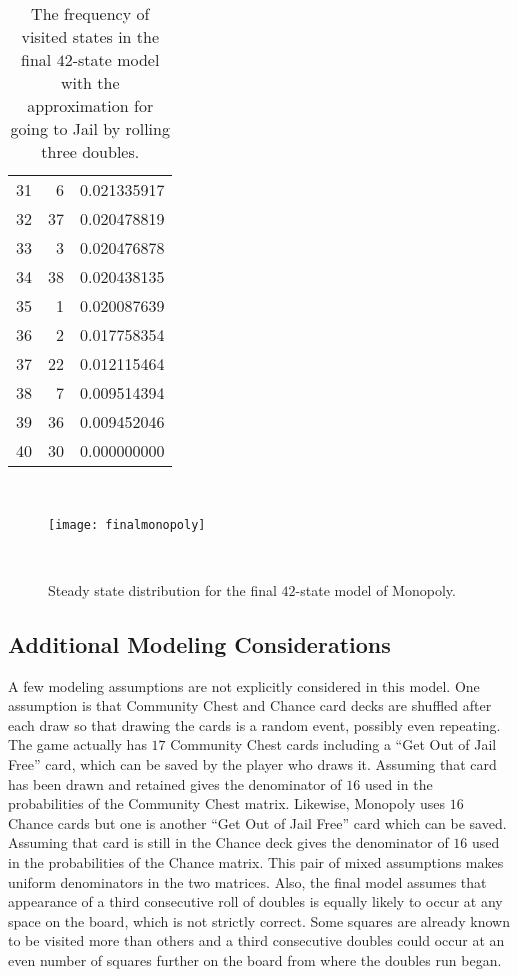 \documentclass[12pt]{article}
\begin{document}
\begin{table}
\begin{tabular}{rrr}
        31 & 6          & 0.021335917 \\ 
        32 & 37         & 0.020478819 \\ 
        33 & 3          & 0.020476878 \\ 
        34 & 38         & 0.020438135 \\ 
        35 & 1          & 0.020087639 \\ 
        36 & 2          & 0.017758354 \\ 
        37 & 22         & 0.012115464 \\ 
        38 & 7          & 0.009514394 \\ 
        39 & 36         & 0.009452046 \\ 
        40 & 30         & 0.000000000 \\ 
    \end{tabular}
    \caption{The frequency of visited states in the final $ 42 $-state
    model with the approximation for going to Jail by rolling three
    doubles.}~%
    \label{tab:monopoly:finalmonopoly}
\end{table}

\begin{figure}
    \centering
    \texttt{[image: finalmonopoly]}
    \caption{Steady state distribution for the final $ 42 $-state
    model of Monopoly.}~%
    \label{fig:monopoly:finalmonopoly}
\end{figure}

\subsection*{Additional Modeling Considerations} A few modeling
assumptions are not explicitly considered in this model.  One assumption
is that Community Chest and Chance card decks are shuffled after each
draw so that drawing the cards is a random event, possibly even
repeating.  The game actually has \( 17 \) Community Chest cards
including a ``Get Out of Jail Free'' card, which can be saved by the
player who draws it.  Assuming that card has been drawn and retained
gives the denominator of \( 16 \) used in the probabilities of the
Community Chest matrix.  Likewise, Monopoly uses \( 16 \) Chance cards
but one is another ``Get Out of Jail Free'' card which can be saved.
Assuming that card is still in the Chance deck gives the denominator of \(
16 \) used in the probabilities of the Chance matrix.  This pair of
mixed assumptions makes uniform denominators in the two matrices.  Also,
the final model assumes that appearance of a third consecutive roll of
doubles is equally likely to occur at any space on the board, which is
not strictly correct.  Some squares are already known to be visited more
than others and a third consecutive doubles could occur at an even
number of squares further on the board from where the doubles run began.
\end{document}
